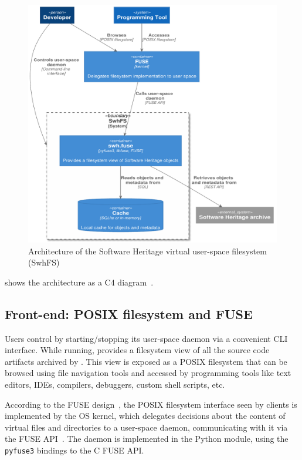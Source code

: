 \begin{figure}
  \centering
  \includegraphics[width=\linewidth]{img/fuse/arch-container}
  \caption{Architecture of the Software Heritage virtual user-space filesystem
    (SwhFS)}%
  \label{fig:swhfs-arch}
\end{figure}

 shows the \SWHFS{} architecture as a C4
diagram~\cite{brown2018c4}.

\subsection{Front-end: POSIX filesystem and FUSE}

Users control \SWHFS{} by starting/stopping its user-space daemon via a
convenient CLI interface. While running, \SWHFS{} provides a filesystem view of
all the source code artifacts archived by \SWH{}. This view is exposed as a
POSIX filesystem that can be browsed using file navigation tools and accessed
by programming tools like text editors, IDEs, compilers, debuggers, custom
shell scripts, etc.

According to the FUSE design~\cite{vangoor2017fuseperf}, the POSIX filesystem
interface seen by \SWHFS{} clients is implemented by the OS kernel, which
delegates decisions about the content of virtual files and directories to a
user-space daemon, communicating with it via the FUSE API~\cite{fuse}. The
\SWHFS{} daemon is implemented in the \SWHFSpy{} Python module, using the
\texttt{pyfuse3}
bindings to the C FUSE API\@.

